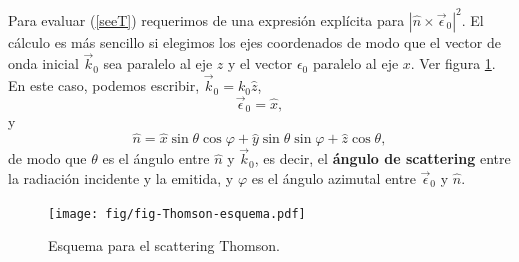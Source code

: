 Para evaluar (\ref{seeT}) requerimos de una expresión explícita para
$\left|\hat{n}\times\vec{\epsilon}_0\right|^2$. El cálculo es más sencillo si elegimos los ejes coordenados de modo que el vector de onda inicial $\vec{k}_0$ sea paralelo al eje $z$ y el vector $\epsilon_0$ paralelo al eje $x$. Ver figura \ref{fig:thomson}. En este caso, podemos escribir, $\vec{k}_0=k_0\hat{z}$, 
\begin{equation}\label{epsilon0}
\vec\epsilon_0=\hat{x},
\end{equation}
y 
\begin{equation}
\hat{n}=\hat{x}\sin\theta\cos\varphi + \hat{y}\sin\theta\sin\varphi +\hat{z}\cos\theta, \label{ene}
\end{equation}
de modo que $\theta$ es el ángulo entre $\hat{n}$ y $\vec{k}_0$, es decir, el
\textbf{ángulo de scattering} entre la radiación incidente y la emitida, y $\varphi$ es el ángulo azimutal entre $\vec{\epsilon}_0$ y
$\hat{n}$.
\begin{figure}[H]
\centerline{\texttt{[image: fig/fig-Thomson-esquema.pdf]}}
 \caption{Esquema para el scattering Thomson.}
\label{fig:thomson}
\end{figure}
